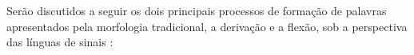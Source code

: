 

Serão discutidos a seguir os dois principais processos de formação de palavras apresentados pela morfologia tradicional, a derivação e a flexão, sob a perspectiva das línguas de sinais \cite{quadros-2004-estudos-linguisticos,hill-2019-sign-languages,klima-1979-signs-of-language}:

